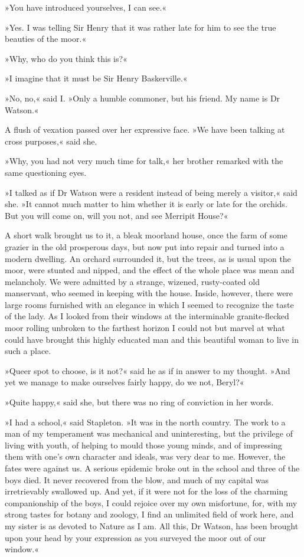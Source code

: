 »You have introduced yourselves, I can see.«

»Yes. I was telling Sir Henry that it was rather late for him to see the true beauties of the moor.«

»Why, who do you think this is?«

»I imagine that it must be Sir Henry Baskerville.«

»No, no,« said I. »Only a humble commoner, but his friend. My name is Dr Watson.«

A flush of vexation passed over her expressive face. »We have been talking at cross purposes,« said she.

»Why, you had not very much time for talk,« her brother remarked with the same questioning eyes.

»I talked as if Dr Watson were a resident instead of being merely a visitor,« said she. »It cannot much matter to him whether it is early or late for the orchids. But you will come on, will you not, and see Merripit House?«

A short walk brought us to it, a bleak moorland house, once the farm of some grazier in the old prosperous days, but now put into repair and turned into a modern dwelling. An orchard surrounded it, but the trees, as is usual upon the moor, were stunted and nipped, and the effect of the whole place was mean and melancholy. We were admitted by a strange, wizened, rusty-coated old manservant, who seemed in keeping with the house. Inside, however, there were large rooms furnished with an elegance in which I seemed to recognize the taste of the lady. As I looked from their windows at the interminable granite-flecked moor rolling unbroken to the farthest horizon I could not but marvel at what could have brought this highly educated man and this beautiful woman to live in such a place.

»Queer spot to choose, is it not?« said he as if in answer to my thought. »And yet we manage to make ourselves fairly happy, do we not, Beryl?«

»Quite happy,« said she, but there was no ring of conviction in her words.

»I had a school,« said Stapleton. »It was in the north country. The work to a man of my temperament was mechanical and uninteresting, but the privilege of living with youth, of helping to mould those young minds, and of impressing them with one's own character and ideals, was very dear to me. However, the fates were against us. A serious epidemic broke out in the school and three of the boys died. It never recovered from the blow, and much of my capital was irretrievably swallowed up. And yet, if it were not for the loss of the charming companionship of the boys, I could rejoice over my own misfortune, for, with my strong tastes for botany and zoology, I find an unlimited field of work here, and my sister is as devoted to Nature as I am. All this, Dr Watson, has been brought upon your head by your expression as you surveyed the moor out of our window.«

